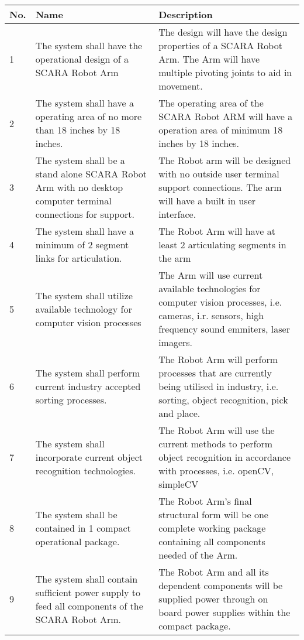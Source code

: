  
\begin{tabular}{ |p{1cm}|p{5cm}|p{7cm}|  }


\hline
No.& Name &Description \\
\hline
1 & The system shall have the operational design of a SCARA Robot Arm &The design will have the design properties of a SCARA Robot Arm. The Arm will have multiple pivoting joints to aid in movement.  \\
2 & The system shall have a operating area of no more than 18 inches by 18 inches.    & The operating area of the SCARA Robot ARM will have a operation area of minimum 18 inches by 18 inches.  \\
3 &The system shall be a stand alone SCARA Robot Arm with no desktop computer terminal connections for support. & The Robot arm will be designed with no outside user terminal support connections. The arm will have a built in user interface.  \\
4    &The system shall have a minimum of 2 segment links for articulation.  & The Robot Arm will have at least 2 articulating segments in the arm \\
5 & The system shall utilize available technology for computer vision processes & The Arm will use current available technologies for computer vision processes, i.e. cameras, i.r. sensors, high frequency sound emmiters, laser imagers.  \\
6 & The system shall perform current industry accepted sorting processes. & The Robot Arm will perform processes that are currently being utilised in industry, i.e. sorting, object recognition, pick and place.   \\
7 & The system shall incorporate current object recognition technologies. & The Robot Arm will use the current methods to perform object recognition in accordance with processes, i.e. openCV, simpleCV \\
8 & The system shall be contained in 1 compact operational package. & The Robot Arm's final structural form will be one complete working package containing all components needed of the Arm.  \\
9 & The system shall contain sufficient power supply to feed all components of the SCARA Robot Arm. & The Robot Arm and all its dependent components will be supplied power through on board power supplies within the compact package. \\

\hline
\end{tabular}

\setlength{\arrayrulewidth}{1mm}
\setlength{\tabcolsep}{18pt}
\renewcommand{\arraystretch}{2.5}
 
